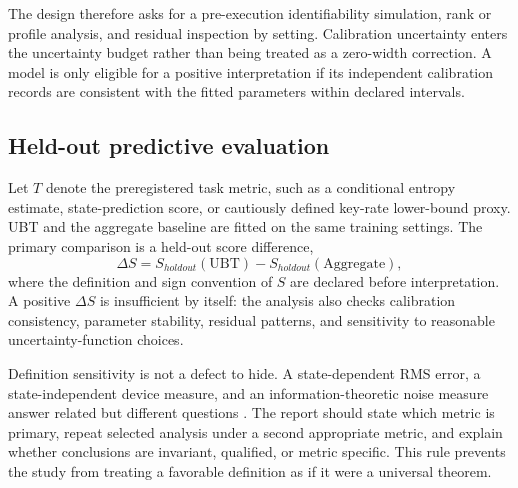 \documentclass[conference]{../../../../Conference-LaTeX-template_10-17-19/IEEEtran}
\newcommand{\UBT}{\mathrm{UBT}}
\begin{document}
The design therefore asks for a pre-execution identifiability simulation, rank or profile analysis, and residual inspection by setting. Calibration uncertainty enters the uncertainty budget rather than being treated as a zero-width correction. A model is only eligible for a positive interpretation if its independent calibration records are consistent with the fitted parameters within declared intervals.

\subsection{Held-out predictive evaluation}

Let $T$ denote the preregistered task metric, such as a conditional entropy estimate, state-prediction score, or cautiously defined key-rate lower-bound proxy. UBT and the aggregate baseline are fitted on the same training settings. The primary comparison is a held-out score difference,
\begin{equation}
\Delta S=S_{holdout}(\UBT)-S_{holdout}(\mathrm{Aggregate}),
\label{eq:score}
\end{equation}
where the definition and sign convention of $S$ are declared before interpretation. A positive $\Delta S$ is insufficient by itself: the analysis also checks calibration consistency, parameter stability, residual patterns, and sensitivity to reasonable uncertainty-function choices.

Definition sensitivity is not a defect to hide. A state-dependent RMS error, a state-independent device measure, and an information-theoretic noise measure answer related but different questions \cite{ozawa2018,buscemi2014}. The report should state which metric is primary, repeat selected analysis under a second appropriate metric, and explain whether conclusions are invariant, qualified, or metric specific. This rule prevents the study from treating a favorable definition as if it were a universal theorem.
\end{document}
